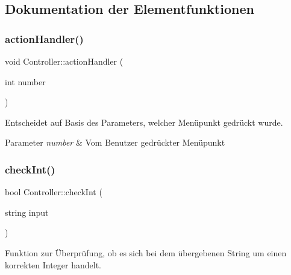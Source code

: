 \subsection{Dokumentation der Elementfunktionen}
\mbox{\label{classContactManager_1_1Controller_afd2e274df3edef5ab0abf90aae5ad21c}} 
\subsubsection{\texorpdfstring{action\+Handler()}{actionHandler()}}
{\footnotesize\ttfamily void Controller\+::action\+Handler (\begin{DoxyParamCaption}\item[{int}]{number }\end{DoxyParamCaption})}



Entscheidet auf Basis des Parameters, welcher Menüpunkt gedrückt wurde.


\begin{DoxyParams}{Parameter}
{\em number} & Vom Benutzer gedrückter Menüpunkt\\
\hline
\end{DoxyParams}
\mbox{\label{classContactManager_1_1Controller_a9228c2d2d075707af32f9cceded67566}} 
\subsubsection{\texorpdfstring{check\+Int()}{checkInt()}\hspace{0.1cm}{\footnotesize\ttfamily [1/2]}}
{\footnotesize\ttfamily bool Controller\+::check\+Int (\begin{DoxyParamCaption}\item[{string}]{input }\end{DoxyParamCaption})\hspace{0.3cm}{\ttfamily [static]}}



Funktion zur Überprüfung, ob es sich bei dem übergebenen String um einen korrekten Integer handelt.


